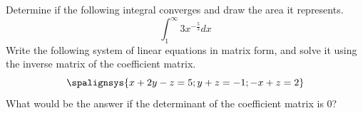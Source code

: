 \documentclass[11.0pt]{exam}
\newcommand{\N}{\mathbb{N}} %
\newcommand{\R}{\mathbb{R}} %
\begin{document}
\begin{questions}

\question[2]
Determine if the following integral converges and draw the area it represents.
\[\int_1^{\infty} 3x^{-\frac{5}{3}} dx\]
\question[2] Write the following system of linear equations in matrix form, and solve it using the inverse matrix of the coefficient matrix.
\[
  \spalignsys{
    x+2y-z=5 ;
    y+z=-1 ;
   -x+z=2
  }
\]
What would be the answer if the determinant of the coefficient matrix is 0?    


        

        


    

\end{questions}
\end{document}
